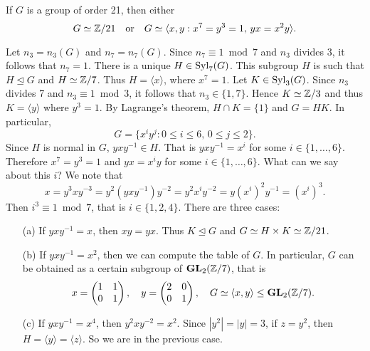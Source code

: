 \begin{example}
If $G$ is a group of order 21, then either 
\[
G\simeq\mathbb{Z}/21
\quad\text{or}\quad 
G\simeq\langle x,y:x^7=y^3=1,\,yx=x^2y\rangle.
\]

Let $n_3=n_3(G)$ and $n_7=n_7(G)$. Since $n_7\equiv1\bmod 7$ and $n_3$ divides $3$, it follows that $n_7=1$. There is a unique
$H\in\mathrm{Syl}_7(G)$. This subgroup $H$ is such that
$H\unlhd G$ and $H\simeq\mathbb{Z}/7$. Thus $H=\langle x\rangle$, where
$x^7=1$.
Let $K\in\mathrm{Syl}_3(G)$. Since $n_3$ divides 7 and
$n_3\equiv1\bmod 3$, it follows that $n_3\in\{1,7\}$. 
Hence $K\simeq\mathbb{Z}/3$ and thus 
$K=\langle y\rangle$ where $y^3=1$. By Lagrange's theorem, 
$H\cap K=\{1\}$ and $G=HK$. In particular,
\[
G=\{x^iy^j:0\leq i\leq 6,\,0\leq j\leq 2\}.
\]
Since $H$ is normal in $G$, $yxy^{-1}\in H$. That is 
$yxy^{-1}=x^i$ for some $i\in\{1,\dots,6\}$. Therefore 
$x^7=y^3=1$ and  $yx=x^iy$ for some $i\in\{1,\dots,6\}$. What can we say about this $i$? We note that
\[
x=y^3xy^{-3}=y^2(yxy^{-1})y^{-2}=y^2x^iy^{-2}=y(x^i)^2y^{-1}=(x^i)^3.
\]
Then $i^3\equiv 1\bmod 7$, that is $i\in\{1,2,4\}$. There are
three cases: 
\begin{enumerate}
        \item[(a)] If $yxy^{-1}=x$, then $xy=yx$. Thus $K\unlhd G$ and $G\simeq H \times K\simeq\mathbb{Z}/21$.
        \item[(b)] If $yxy^{-1}=x^2$, then we can compute the table of $G$. In particular, $G$ can be obtained as a certain subgroup of  $\mathbf{GL}_2(\mathbb{Z}/7)$, that is 
        \[
        x=\begin{pmatrix}
        1&1\\
        0&1\end{pmatrix},
        \quad
        y=\begin{pmatrix}
        2&0\\
        0&1\end{pmatrix},
        \quad
        G\simeq\langle x,y\rangle\leq \mathbf{GL}_2(\mathbb{Z}/7).
\]
\item[(c)] If $yxy^{-1}=x^4$, then $y^2xy^{-2}=x^2$. Since $|y^2|=|y|=3$, if $z=y^2$, then $H=\langle y\rangle=\langle z\rangle$. 
So we are in the previous case. 
\end{enumerate}
\end{example}

